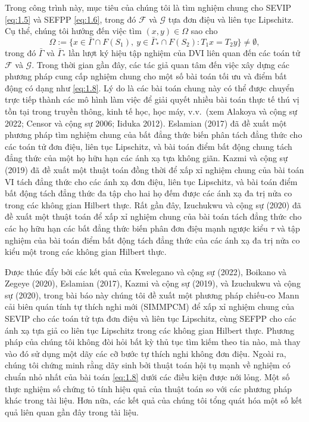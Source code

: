 \documentclass{MyBook}
\theoremstyle{plain}
\theoremstyle{definition}
\theoremstyle{remark}
\numberwithin{equation}{chapter}
\newcommand{\Fc}{\mathcal{F}}
\newcommand{\Gc}{\mathcal{G}}
\newcommand{\Gam}{\bar{\Gamma}}
\newcommand{\Gams}{\bar{\Gamma}_{*}}
\newcommand{\Fix}[1]{F(#1)}
\begin{document}
Trong công trình này, mục tiêu của chúng tôi là tìm nghiệm chung cho SEVIP \eqref{eq:1.5} và SEFPP \eqref{eq:1.6}, trong đó $\Fc$ và $\Gc$ tựa đơn điệu và liên tục Lipschitz. Cụ thể, chúng tôi hướng đến việc tìm $(x,y)\in\Omega$ sao cho
\begin{equation}
\Omega := \{x\in\Gam\cap \Fix{S_1},\ y\in\Gams\cap \Fix{S_2}:T_1x=T_2y\}\ne\emptyset, \label{eq:1.8}
\end{equation}
trong đó $\Gam$ và $\Gams$ lần lượt ký hiệu tập nghiệm của DVI liên quan đến các toán tử $\Fc$ và $\Gc$. Trong thời gian gần đây, các tác giả quan tâm đến việc xây dựng các phương pháp cung cấp nghiệm chung cho một số bài toán tối ưu và điểm bất động có dạng như \eqref{eq:1.8}. Lý do là các bài toán chung này có thể được chuyển trực tiếp thành các mô hình làm việc để giải quyết nhiều bài toán thực tế thú vị tồn tại trong truyền thông, kinh tế học, học máy, v.v.\ (xem Alakoya và cộng sự 2022; Censor và cộng sự 2006; Iiduka 2012). Eslamian (2017) đã đề xuất một phương pháp tìm nghiệm chung của bất đẳng thức biến phân tách đẳng thức cho các toán tử đơn điệu, liên tục Lipschitz, và bài toán điểm bất động chung tách đẳng thức của một họ hữu hạn các ánh xạ tựa không giãn. Kazmi và cộng sự (2019) đã đề xuất một thuật toán đồng thời để xấp xỉ nghiệm chung của bài toán VI tách đẳng thức cho các ánh xạ đơn điệu, liên tục Lipschitz, và bài toán điểm bất động tách đẳng thức đa tập cho hai họ đếm được các ánh xạ đa trị nửa co trong các không gian Hilbert thực. Rất gần đây, Izuchukwu và cộng sự (2020) đã đề xuất một thuật toán để xấp xỉ nghiệm chung của bài toán tách đẳng thức cho các họ hữu hạn các bất đẳng thức biến phân đơn điệu mạnh ngược kiểu $\tau$ và tập nghiệm của bài toán điểm bất động tách đẳng thức của các ánh xạ đa trị nửa co kiểu một trong các không gian Hilbert thực.

Được thúc đẩy bởi các kết quả của Kwelegano và cộng sự (2022), Boikano và Zegeye (2020), Eslamian (2017), Kazmi và cộng sự (2019), và Izuchukwu và cộng sự (2020), trong bài báo này chúng tôi đề xuất một phương pháp chiếu-co Mann cải biên quán tính tự thích nghi mới (SIMMPCM) để xấp xỉ nghiệm chung của SEVIP cho các toán tử tựa đơn điệu và liên tục Lipschitz, cùng SEFPP cho các ánh xạ tựa giả co liên tục Lipschitz trong các không gian Hilbert thực. Phương pháp của chúng tôi không đòi hỏi bất kỳ thủ tục tìm kiếm theo tia nào, mà thay vào đó sử dụng một dãy các cỡ bước tự thích nghi không đơn điệu. Ngoài ra, chúng tôi chứng minh rằng dãy sinh bởi thuật toán hội tụ mạnh về nghiệm có chuẩn nhỏ nhất của bài toán \eqref{eq:1.8} dưới các điều kiện được nới lỏng. Một số thực nghiệm số chứng tỏ tính hiệu quả của thuật toán so với các phương pháp khác trong tài liệu. Hơn nữa, các kết quả của chúng tôi tổng quát hóa một số kết quả liên quan gần đây trong tài liệu.
\end{document}
